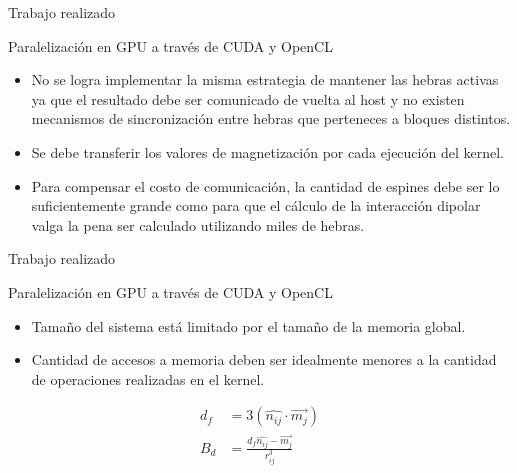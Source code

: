 \begin{frame}{Trabajo realizado}
\begin{block}{Paralelización en GPU a través de CUDA y OpenCL}
\begin{itemize}
  \item No se logra implementar la misma estrategia de mantener las hebras activas ya que el resultado debe ser comunicado de vuelta al host y no existen mecanismos de sincronización entre hebras que perteneces a bloques distintos.
  \item Se debe transferir los valores de magnetización por cada ejecución del kernel.
  \item Para compensar el costo de comunicación, la cantidad de espines debe ser lo suficientemente grande como para que el cálculo de la interacción dipolar valga la pena ser calculado utilizando miles de hebras.
\end{itemize}
\end{block}
\end{frame}

\begin{frame}{Trabajo realizado}
\begin{block}{Paralelización en GPU a través de CUDA y OpenCL}
\begin{itemize}
  \item Tamaño del sistema está limitado por el tamaño de la memoria global.
  \item Cantidad de accesos a memoria deben ser idealmente menores a la cantidad de operaciones realizadas en el kernel.
\end{itemize}
\begin{equation}
\label{formula:kerneldipolar}
\begin{aligned}
  d_f &= 3(\hat{n_{ij}} \cdot \vec{m_j}) \\
  {B_d} &= \frac{d_f\hat{n_{ij}} - \vec{m_j}}{r_{ij}^3} \\
\end{aligned}
\end{equation}
\end{block}
\end{frame}

